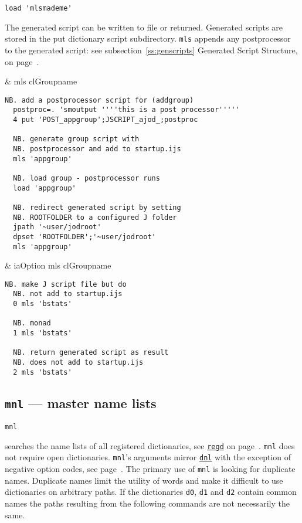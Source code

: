 \begin{lstlisting}[frame=single,framerule=0pt]
  load 'mlsmademe'
\end{lstlisting}

The generated script can be written to file or returned. 
Generated scripts are stored in the put dictionary script subdirectory.  
\texttt{mls} appends any postprocessor to the generated script: 
see subsection~\ref{ss:genscripts} Generated Script Structure, on page~\pageref{ss:genscripts}.

\begin{wordhead}
\monad & mls clGroupname \\
\end{wordhead}
\begin{lstlisting}[frame=single,framerule=0pt] 
  NB. add a postprocessor script for (addgroup) 
  postproc=. 'smoutput ''''this is a post processor'''''
  4 put 'POST_appgroup';JSCRIPT_ajod_;postproc  

  NB. generate group script with 
  NB. postprocessor and add to startup.ijs
  mls 'appgroup' 
  
  NB. load group - postprocessor runs
  load 'appgroup'
  
  NB. redirect generated script by setting 
  NB. ROOTFOLDER to a configured J folder 
  jpath '~user/jodroot' 
  dpset 'ROOTFOLDER';'~user/jodroot'
  mls 'appgroup'
\end{lstlisting}

\begin{wordhead}
\dyad & iaOption mls clGroupname \\
\end{wordhead}
\begin{lstlisting}[frame=single,framerule=0pt] 
  NB. make J script file but do 
  NB. not add to startup.ijs
  0 mls 'bstats' 

  NB. monad 
  1 mls 'bstats' 

  NB. return generated script as result 
  NB. does not add to startup.ijs  
  2 mls 'bstats' 
\end{lstlisting}

\subsection{\texttt{mnl} --- master name lists}\label{ss:mnl}

\hypertarget{il:mnl}{\texttt{mnl}} searches 
the name lists of all registered dictionaries, see \hyperlink{il:regd}{\texttt{regd}} on page~\pageref{ss:regd}.
 \texttt{mnl} does not require open dictionaries. 
\texttt{mnl}'s arguments mirror \hyperlink{il:dnl}{\texttt{dnl}} with the 
exception of negative option codes, see page~\pageref{ss:dnl}.  
The primary use of \texttt{mnl} is looking for duplicate names. Duplicate names limit the utility of words
and make it difficult to use dictionaries on arbitrary paths.
If the dictionaries \texttt{d0}, \texttt{d1} and \texttt{d2}
contain common names the paths resulting from the following commands 
are not necessarily the same.

